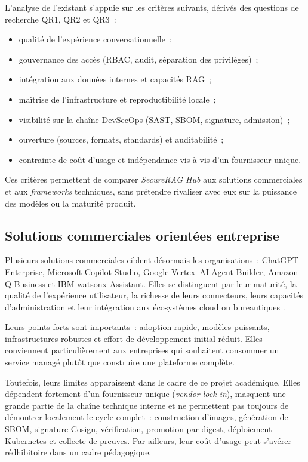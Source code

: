 L'analyse de l'existant s'appuie sur les critères suivants, dérivés des questions de recherche QR1, QR2 et QR3~:
\begin{itemize}
    \item qualité de l'expérience conversationnelle~;
    \item gouvernance des accès (RBAC, audit, séparation des privilèges)~;
    \item intégration aux données internes et capacités RAG~;
    \item maîtrise de l'infrastructure et reproductibilité locale~;
    \item visibilité sur la chaîne DevSecOps (SAST, SBOM, signature, admission)~;
    \item ouverture (sources, formats, standards) et auditabilité~;
    \item contrainte de coût d'usage et indépendance vis-à-vis d'un fournisseur unique.
\end{itemize}

Ces critères permettent de comparer \textit{SecureRAG Hub} aux solutions commerciales et aux \textit{frameworks} techniques, sans prétendre rivaliser avec eux sur la puissance des modèles ou la maturité produit.

\subsection{Solutions commerciales orientées entreprise}

Plusieurs solutions commerciales ciblent désormais les organisations~: ChatGPT Enterprise, Microsoft Copilot Studio, Google Vertex~AI Agent Builder, Amazon Q Business et IBM watsonx Assistant. Elles se distinguent par leur maturité, la qualité de l'expérience utilisateur, la richesse de leurs connecteurs, leurs capacités d'administration et leur intégration aux écosystèmes cloud ou bureautiques \cite{openai_chatgpt_enterprise,microsoft_copilot_studio,google_vertex_ai_agent_builder,aws_q_business,ibm_watsonx_assistant}.

Leurs points forts sont importants~: adoption rapide, modèles puissants, infrastructures robustes et effort de développement initial réduit. Elles conviennent particulièrement aux entreprises qui souhaitent consommer un service managé plutôt que construire une plateforme complète.

Toutefois, leurs limites apparaissent dans le cadre de ce projet académique. Elles dépendent fortement d'un fournisseur unique (\textit{vendor lock-in}), masquent une grande partie de la chaîne technique interne et ne permettent pas toujours de démontrer localement le cycle complet~: construction d'images, génération de SBOM, signature Cosign, vérification, promotion par digest, déploiement Kubernetes et collecte de preuves. Par ailleurs, leur coût d'usage peut s'avérer rédhibitoire dans un cadre pédagogique.

